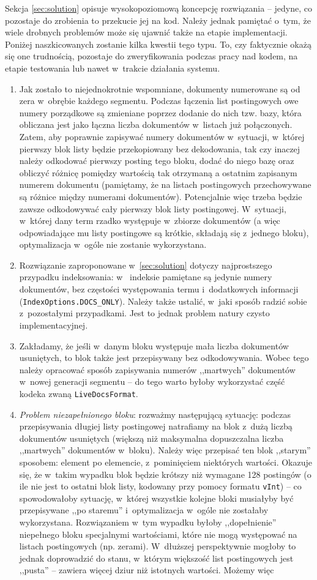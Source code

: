 Sekcja \ref{sec:solution} opisuje wysokopoziomową koncepcję rozwiązania -- jedyne, co pozostaje do zrobienia to przekucie jej na kod. Należy jednak pamiętać o~tym, że wiele drobnych problemów może się ujawnić także na etapie implementacji. Poniżej naszkicowanych zostanie kilka kwestii tego typu. To, czy faktycznie okażą się one trudnością, pozostaje do zweryfikowania podczas pracy nad kodem, na etapie testowania lub nawet w~trakcie działania systemu. 
\begin{enumerate}
 \item Jak zostało to niejednokrotnie wspomniane, dokumenty numerowane są od zera w~obrębie każdego segmentu. Podczas łączenia list postingowych owe numery porządkowe są zmieniane poprzez dodanie do nich tzw. bazy, która obliczana jest jako łączna liczba dokumentów w~listach już połączonych. Zatem, aby poprawnie zapisywać numery dokumentów w~sytuacji, w~której pierwszy blok listy będzie przekopiowany bez dekodowania, tak czy inaczej należy odkodować pierwszy posting tego bloku, dodać do niego bazę oraz obliczyć różnicę pomiędzy wartością tak otrzymaną a ostatnim zapisanym numerem dokumentu (pamiętamy, że na listach postingowych przechowywane są różnice między numerami dokumentów). Potencjalnie więc trzeba będzie zawsze odkodowywać cały pierwszy blok listy postingowej. W~sytuacji, w~której dany term rzadko występuje w~zbiorze dokumentów (a więc odpowiadające mu listy postingowe są krótkie, składają się z~jednego bloku), optymalizacja w~ogóle nie zostanie wykorzystana.
 \item Rozwiązanie zaproponowane w~\ref{sec:solution} dotyczy najprostszego przypadku indeksowania: w~ indeksie pamiętane są jedynie numery dokumentów, bez częstości występowania termu i~dodatkowych informacji (\texttt{IndexOptions.DOCS\_ONLY}). Należy także ustalić, w~jaki sposób radzić sobie z~pozostałymi przypadkami. Jest to jednak problem natury czysto implementacyjnej.
 \item Zakładamy, że jeśli w~danym bloku występuje mała liczba dokumentów usuniętych, to blok także jest przepisywany bez odkodowywania. Wobec tego należy opracować sposób zapisywania numerów ,,martwych'' dokumentów w~nowej generacji segmentu -- do tego warto byłoby wykorzystać część kodeka zwaną \texttt{LiveDocsFormat}.
 \item \emph{Problem niezapełnionego bloku}: rozważmy następującą sytuację: podczas przepisywania długiej listy postingowej natrafiamy na blok z~dużą liczbą dokumentów usuniętych (większą niż maksymalna dopuszczalna liczba ,,martwych'' dokumentów w~bloku). Należy więc przepisać ten blok ,,starym'' sposobem: element po elemencie, z~pominięciem niektórych wartości. Okazuje się, że w~takim wypadku blok będzie krótszy niż wymagane 128 postingów (o ile nie jest to ostatni blok listy, kodowany przy pomocy formatu \texttt{vInt}) -- co spowodowałoby sytuację, w~której wszystkie kolejne bloki musiałyby być przepisywane ,,po staremu'' i~optymalizacja w~ogóle nie zostałaby wykorzystana. Rozwiązaniem w~tym wypadku byłoby ,,dopełnienie'' niepełnego bloku specjalnymi wartościami, które nie mogą występować na listach postingowych (np. zerami). W~dłuższej perspektywnie mogłoby to jednak doprowadzić do stanu, w~którym większość list postingowych jest ,,pusta'' -- zawiera więcej dziur niż istotnych wartości. Możemy więc 

\end{enumerate}

